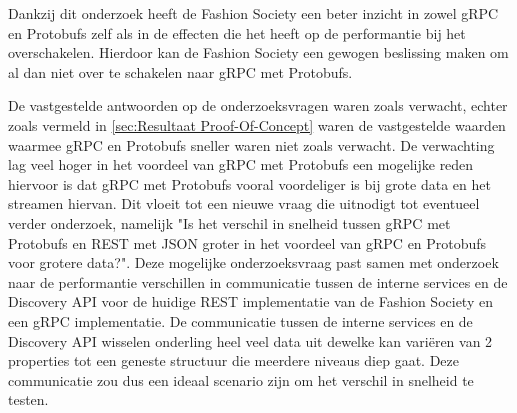 Dankzij dit onderzoek heeft de Fashion Society een beter inzicht in zowel gRPC en Protobufs zelf als in de effecten die het heeft op de performantie bij het overschakelen. Hierdoor kan de Fashion Society een gewogen beslissing maken om al dan niet over te schakelen naar gRPC met Protobufs.

De vastgestelde antwoorden op de onderzoeksvragen waren zoals verwacht, echter zoals vermeld in \ref{sec:Resultaat Proof-Of-Concept} waren de vastgestelde waarden waarmee gRPC en Protobufs sneller waren niet zoals verwacht. De verwachting lag veel hoger in het voordeel van gRPC met Protobufs een mogelijke reden hiervoor is dat gRPC met Protobufs vooral voordeliger is bij grote data en het streamen hiervan. Dit vloeit tot een nieuwe vraag die uitnodigt tot eventueel verder onderzoek, namelijk "Is het verschil in snelheid tussen gRPC met Protobufs en REST met JSON groter in het voordeel van gRPC en Protobufs voor grotere data?". Deze mogelijke onderzoeksvraag past samen met onderzoek naar de performantie verschillen in communicatie tussen de interne services en de Discovery API voor de huidige REST implementatie van de Fashion Society en een gRPC implementatie. De communicatie tussen de interne services en de Discovery API wisselen onderling heel veel data uit dewelke kan variëren van 2 properties tot een geneste structuur die meerdere niveaus diep gaat. Deze communicatie zou dus een ideaal scenario zijn om het verschil in snelheid te testen.





